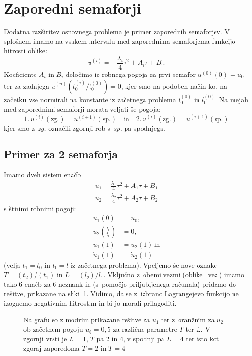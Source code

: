 \documentclass[a4paper,pdftex,12pt]{article} %
\numberwithin{equation}{section} %
\numberwithin{figure}{section} %
\numberwithin{table}{section} %
\begin{document}

\section{Zaporedni semaforji}
Dodatna razširitev osnovnega problema je primer zaporednih semaforjev. V splošnem imamo
na vsakem intervalu med zaporednima semaforjema funkcijo hitrosti oblike:
\begin{equation}
    u^{(i)} = - \frac{\lambda_i}{4} \tau^2 + A_i \tau + B_i.
\end{equation}
Koeficiente $A_i$ in $B_i$ določimo iz robnega pogoja za prvi semafor $u^{(0)}(0)=u_0$ ter
za zadnjega $\dot u^{(n)}(t_0^{(i)}/t_0^{(0)}) = 0$, kjer smo na podoben način kot na 
začetku vse normirali na konstante iz začetnega problema $t_0^{(0)}$ in $l_0^{(0)}$. Na 
mejah med zaporednimi semaforji morata veljati še pogoja:
\begin{equation}
    1. \, u^{(i)}(\mathrm{zg.})=u^{(i+1)}(\mathrm{sp.}) \quad \mathrm{in} \quad
    2. \, \dot u^{(i)}(\mathrm{zg.})=\dot u^{(i+1)}(\mathrm{sp.})
\end{equation}
kjer smo z~\emph{zg.} označili zgornji rob s~\emph{sp.} pa spodnjega. 
\subsection{Primer za 2 semaforja}
Imamo dveh sistem enačb
\begin{align}
    u_1 = \frac{\lambda_1}{4}\tau^2 + A_1\tau + B_1  \\
    u_2 = \frac{\lambda_2}{4}\tau^2 + A_2\tau + B_2
\end{align}
s štirimi robnimi pogoji:
\begin{align}
    u_1 (0)  &= u_0, \\
    u_2 \left( \frac{t_1}{t_1} \right) &= 0, \\
    u_1 (1) &= u_2 (1) \, \mathrm{in}\\
    \dot u_1 (1) &= \dot u_2 (1) 
\end{align}
(velja $t_1=t_0$ in $l_1=l$ iz začetnega problema). Vpeljemo še nove oznake 
$T= (t_2)/(t_1)$ in $L=(l_2)/l_1$. Vključno z~obemi vezmi (oblike~\ref{vez}) imamo
tako $6$ enačb za $6$ neznank in (s~pomočjo priljubljenega računala) pridemo do rešitve,
prikazane na sliki~\ref{slika5}. Vidimo, da se z~izbrano Lagrangejevo funkcijo ne izognemo
negativnim hitrostim in bi jo morali prilagoditi. 
\begin{figure}    
    
    \caption{Na grafu so z modrim prikazane rešitve za $u_1$ ter z~oranžnim za $u_2$ 
    ob začetnem pogoju $u_0=0,5$ za različne parametre $T$ ter $L$. V zgornji vrsti je 
    $L=1$, $T$ pa $2$ in $4$, v spodnji pa $L=4$ ter isto kot zgoraj zaporedoma $T=2$ in 
    $T=4$.}
    \label{slika5}
\end{figure}
\end{document}
